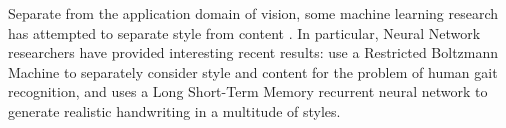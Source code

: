 Separate from the application domain of vision, some machine learning research has attempted to separate style from content \parencite{Tenenbaum2000}.
In particular, Neural Network researchers have provided interesting recent results: \cite{Taylor-ICML-2009} use a Restricted Boltzmann Machine to separately consider style and content for the problem of human gait recognition, and \cite{Graves-arxiv-2013} uses a Long Short-Term Memory recurrent neural network to generate realistic handwriting in a multitude of styles.
